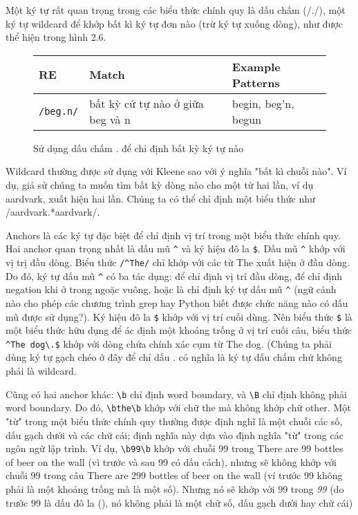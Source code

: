 Một ký tự rất quan trọng trong các biểu thức chính quy là dấu chấm (/./), một ký tự wildcard để khớp bất kì ký tự đơn nào (trừ ký tự xuống dòng), như được thể hiện trong hình 2.6.

\begin{figure}[h]
	\begin{tabular}{ l l l }
	 \hline
	 RE & Match & Example Patterns \\
	 \hline
	 \verb|/beg.n/| & bất kỳ cứ tự nào ở giữa beg và n & begin, beg'n, begun \\
	 \hline
	\end{tabular}
 \caption{Sử dụng dấu chấm . để chỉ định bất kỳ ký tự nào}
 \label{table:2.6}
\end{figure}

Wildcard thường được sử dụng với Kleene sao với ý nghĩa "bất kì chuỗi nào". Ví dụ, giả sử chúng ta muốn tìm bất kỳ dòng nào cho một từ hai lần, ví dụ aardvark, xuất hiện hai lần. Chúng ta có thể chỉ định một biểu thức như /aardvark.*aardvark/.

Anchors là các ký tự đặc biệt để chỉ định vị trí trong một biểu thức chính quy. Hai anchor quan trọng nhất là dấu mũ \verb|^| và ký hiệu đô la \verb|$|. Dấu mũ \verb|^| khớp với vị trị đầu dòng. Biểu thức \verb|/^The/| chỉ khớp với các từ The xuất hiện ở đầu dòng. Do đó, ký tự dấu mũ \verb|^| có ba tác dụng: để chỉ định vị trí đầu dòng, để chỉ định negation khi ở trong ngoặc vuông, hoặc là chỉ định ký tự dấu mũ \verb|^| (ngữ cảnh nào cho phép các chương trình grep hay Python biết được chức năng nào có dấu mũ được sử dụng?). Ký hiệu đô la \verb|$| khớp với vị trí cuối dùng. Nên biểu thức \textvisiblespace \verb|$| là một biểu thức hữu dụng để ác định một khoảng trống ở vị trí cuối câu, biểu thức \verb|^The dog\.$| khớp với dòng chứa chính xác cụm từ The dog. (Chúng ta phải dùng ký tự gạch chéo ở đây để chỉ dấu . có nghĩa là ký tự dấu chấm chứ không phải là wildcard.

Cũng có hai anchor khác: \verb|\b| chỉ định word boundary, và \verb|\B| chỉ định không phải word boundary. Do đó, \verb|\bthe\b| khớp với chữ the mà không khớp chữ other. Một "từ" trong một biểu thức chính quy thường được định nghĩ là một chuỗi các số, dấu gạch dưới và các chữ cái; định nghĩa này dựa vào định nghĩa "từ" trong các ngôn ngữ lập trình. Ví dụ, \verb|\b99\b| khớp với chuỗi 99 trong There are 99 bottles of beer on the wall (vì trước và sau 99 có dấu cách), nhưng sẽ không khớp với chuỗi 99 trong câu There are 299 bottles of beer on the wall (ví trước 99 không phải là một khoảng trống mà là một số). Nhưng nó sẽ khớp với 99 trong \textit{99} (do trước 99 là dấu đô la (), nó không phải là một chữ số, dấu gạch dưới hay chữ cái)

